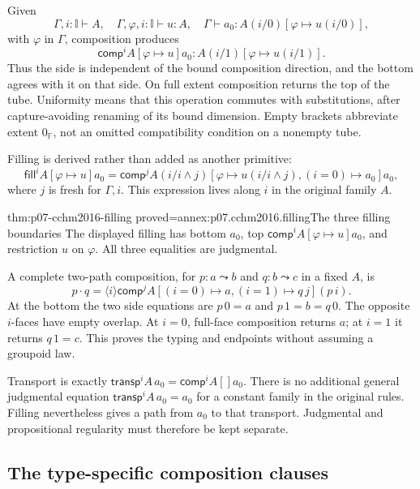 Given
\[
 \Gamma,i:\mathbb I\vdash A,\quad
 \Gamma,\varphi,i:\mathbb I\vdash u:A,\quad
 \Gamma\vdash a_0:A(i/0)[\varphi\mapsto u(i/0)],
\]
with \(\varphi\) in \(\Gamma\), composition produces
\[
 \mathsf{comp}^{i}A[\varphi\mapsto u]a_0
       :A(i/1)[\varphi\mapsto u(i/1)].
\]
Thus the side is independent of the bound composition direction, and
the bottom agrees with it on that side.  On full extent composition
returns the top of the tube.  Uniformity means that this operation
commutes with substitutions, after capture-avoiding renaming of its
bound dimension.  Empty brackets abbreviate extent \(0_{\mathbb F}\),
not an omitted compatibility condition on a nonempty tube.

Filling is derived rather than added as another primitive:
\[
 \mathsf{fill}^{i}A[\varphi\mapsto u]a_0
 =\mathsf{comp}^{j}A(i/i\wedge j)
       [\varphi\mapsto u(i/i\wedge j),(i=0)\mapsto a_0]a_0,
\]
where \(j\) is fresh for \(\Gamma,i\).  This expression lives along
\(i\) in the original family \(A\).

\begin{hblemma}{thm:p07-cchm2016-filling}
 {proved=annex:p07.cchm2016.filling}{The three filling boundaries}
The displayed filling has bottom \(a_0\), top
\(\mathsf{comp}^{i}A[\varphi\mapsto u]a_0\), and restriction \(u\)
on \(\varphi\).  All three equalities are judgmental.
\end{hblemma}

A complete two-path composition, for \(p:a\leadsto b\) and
\(q:b\leadsto c\) in a fixed \(A\), is
\[
 p\mathbin{\cdot}q
 =\langle i\rangle\mathsf{comp}^{j}A
       [(i=0)\mapsto a,(i=1)\mapsto q\,j](p\,i).
\]
At the bottom the two side equations are \(p\,0=a\) and
\(p\,1=b=q\,0\).  The opposite \(i\)-faces have empty overlap.
At \(i=0\), full-face composition returns \(a\); at \(i=1\) it
returns \(q\,1=c\).  This proves the typing and endpoints without
assuming a groupoid law.

Transport is exactly
\(\mathsf{transp}^{i}A\,a_0=\mathsf{comp}^{i}A[]a_0\).
There is no additional general judgmental equation
\(\mathsf{transp}^{i}A\,a_0=a_0\) for a constant family in the
original rules.  Filling nevertheless gives a path from \(a_0\) to
that transport.  Judgmental and propositional regularity must therefore
be kept separate.

\subsection{The type-specific composition clauses}
\label{sec:p07-cchm2016-type-composition}

